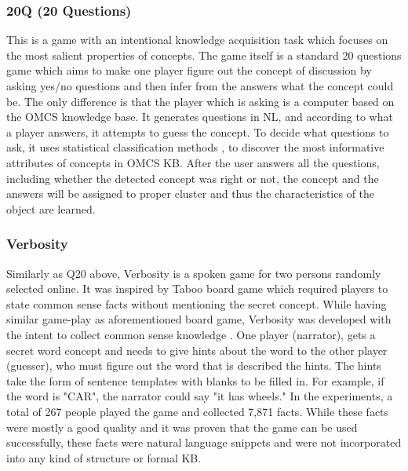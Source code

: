 \subsubsection{20Q (20 Questions)}
\label{section:r:20q}
This is a game with an intentional knowledge acquisition task
which focuses on the most salient properties of concepts. The game itself is
a standard 20 questions game which aims to make one player figure out the 
concept of discussion by asking yes/no questions and then infer from the 
answers what the concept could be. The only difference is that the player which
is asking is a computer based on the OMCS knowledge base. It generates questions in
NL, and according to what a player answers, it attempts to guess the concept.
To decide what questions to ask, it uses statistical classification methods
\parencite{Speer2009}, to discover the most informative attributes of concepts
in OMCS KB. After the user answers all the questions, including whether the
detected concept was right or not, the concept and the answers will be assigned
to proper cluster and thus the characteristics of the object are learned.

\subsubsection{Verbosity}
\label{section:r:verbosity}
Similarly as Q20 above, Verbosity is a spoken game for two 
persons randomly selected online. It was inspired by Taboo board 
game \parencite{TabooGame} which required players to state common sense facts
without mentioning the secret concept. While having similar game-play as 
aforementioned board game, Verbosity was developed with the intent to collect
common sense knowledge \parencite{VonAhn2006a}. One player (narrator), gets
a secret word concept and needs to give hints about the word to the other 
player (guesser), who must figure out the word that is described the hints.
The hints take the form of sentence templates with blanks to be filled in. 
For example, if the word is "CAR", the narrator could say "it has wheels."
In the experiments, a total of 267 people played the game and collected
7,871 facts. While these facts were mostly a good quality and it was proven
that the game can be used successfully, these facts were natural language 
snippets and were not incorporated into any kind of structure or formal KB. 

